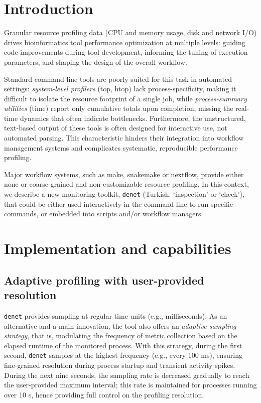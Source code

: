 \documentclass[10pt]{article}
\begin{document}
\section*{Introduction}  %
\label{sec:intro}

Granular resource profiling data (CPU and memory usage, disk and network I/O) drives bioinformatics tool performance optimization at multiple levels: guiding code improvements during tool development, informing the tuning of execution parameters, and shaping the design of the overall workflow.

Standard command-line tools are poorly suited for this task in automated settings: \emph{system-level profilers} (top, htop) lack process-specificity, making it difficult to isolate the resource footprint of a single job, while \emph{process-summary utilities} (time) report only cumulative totals upon completion, missing the real-time dynamics that often indicate bottlenecks. Furthermore, the unstructured, text-based output of these tools is often designed for interactive use, not automated parsing. This characteristic hinders their integration into workflow management systems and complicates systematic, reproducible performance profiling.

Major workflow systems, such as make, snakemake or nextflow, provide either none or coarse-grained and non-customizable resource profiling. In this context, we describe a new monitoring toolkit, \texttt{denet} (Turkish: `inspection' or `check'), that could be either used interactively in the command line to run specific commands, or embedded into scripts and/or workflow managers.

\section*{Implementation and capabilities}

\subsection*{Adaptive profiling with user-provided resolution}

\texttt{denet} provides sampling at regular time units (e.g., milliseconds). As an alternative and a main innovation, the tool also offers an \emph{adaptive sampling strategy}, that is, modulating the frequency of metric collection based on the elapsed runtime of the monitored process. With this strategy, during the first second, \texttt{denet} samples at the highest frequency (e.g., every 100 ms), ensuring fine-grained resolution during process startup and transient activity spikes. During the next nine seconds, the sampling rate is decreased gradually to reach the user-provided maximum interval; this rate is maintained for processes running over 10 s, hence providing full control on the profiling resolution.
\end{document}
